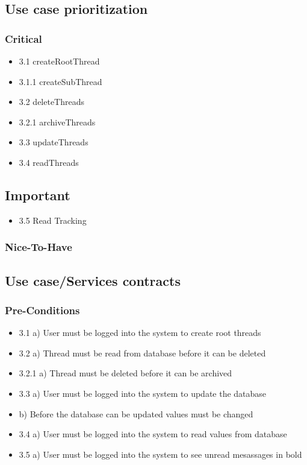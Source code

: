 \documentclass[hidelinks, 12pt, oneside]{article}
\begin{document}
\subsection{Use case prioritization}
\subsubsection{Critical}
\begin{itemize}
  \item 3.1 createRootThread
  \item 3.1.1 createSubThread
  \item 3.2 deleteThreads
  \item 3.2.1 archiveThreads
  \item 3.3 updateThreads
  \item 3.4 readThreads
\end{itemize}
\subsection{Important}
 \begin{itemize}
  \item 3.5 Read Tracking
 \end{itemize}

\subsubsection{Nice-To-Have}


\subsection{Use case/Services contracts}
\subsubsection{Pre-Conditions}								%
\begin{itemize}
  \item 3.1 a) User must be logged into the system to create root threads
  \item 3.2 a) Thread must be read from database before it can be deleted
  \item 3.2.1 a) Thread must be deleted before it can be archived
  \item 3.3 a) User must be logged into the system to update the database
  \item     b) Before the database can be updated values must be changed
  \item 3.4 a) User must be logged into the system to read values from database
  \item 3.5 a) User must be logged into the system to see unread mesassages in bold
\end{itemize}
\end{document}
